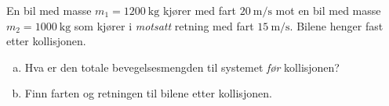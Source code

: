 %
En bil med masse $m_1 = \SI{1200}{\kilo\gram}$ kjører med fart $\SI{20}{\metre\per\second}$ mot en bil med masse $m_2 = \SI{1000}{\kilo\gram}$ som kjører i \textit{motsatt} retning med fart $\SI{15}{\metre\per\second}$. Bilene henger fast etter kollisjonen.
\begin{enumerate}[a)]
    \item Hva er den totale bevegelsesmengden til systemet \textit{før} kollisjonen?
    \item Finn farten og retningen til bilene etter kollisjonen.
\end{enumerate}
